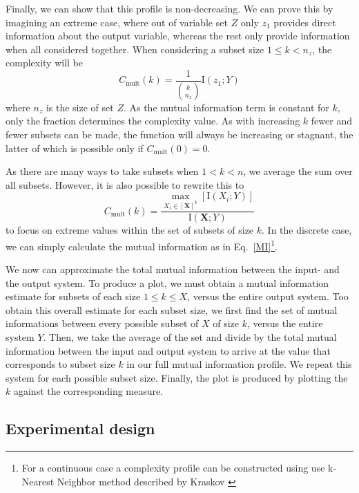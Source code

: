 \documentclass[../main.tex]{subfiles}
\begin{document}
Finally, we can show that this profile is non-decreasing.
We can prove this by imagining an extreme case, where out of variable set $Z$ only $z_1$ provides direct information about the output variable, whereas the rest only provide information when all considered together.
When considering a subset size $1 \le k < n_z $, the complexity will be
%
\begin{equation}
C_\mathrm{mult}\left( k \right)  = \frac{1}{\binom{k}{n_z}} \mathrm{I}\left( z_1;Y\right)
\end{equation}
%
where $n_z$ is the size of set $Z$.
As the mutual information term is constant for $k$, only the fraction determines the complexity value.
As with increasing $k$ fewer and fewer subsets can be made, the function will always be increasing or stagnant, the latter of which is possible only if $C_\mathrm{mult}\left( 0 \right) = 0$.

As there are many ways to take subsets when $1 < k < n$, we average the sum over all subsets.
However, it is also possible to rewrite this to
%
\begin{equation}
C_\mathrm{mult}\left( k \right) = \frac{\max_{X_i \in [\mathbf{X}]^k} [\mathrm{I}\left( X_i;Y \right)]}{\mathrm{I}\left( \mathbf{X};Y\right)}
\end{equation}
%
to focus on extreme values within the set of subsets of size $k$.
In the discrete case, we can simply calculate the mutual information as in Eq.~\ref{MI}\footnote{For a continuous case a complexity profile can be constructed using use k-Nearest Neighbor method described by Kraskov \cite{kraskov2004estimating}}.

We now can approximate the total mutual information between the input- and the output system.
To produce a plot, we must obtain a mutual information estimate for subsets of each size $1 \le k \le X$, versus the entire output system.
Too obtain this overall estimate for each subset size, we first find the set of mutual informations between every possible subset of $X$ of size $k$, versus the entire system $Y$.
Then, we take the average of the set and divide by the total mutual information between the input and output system to arrive at the value that corresponds to subset size $k$ in our full mutual information profile.
We repeat this system for each possible subset size.
Finally, the plot is produced by plotting the $k$ against the corresponding measure.

\subsection{Experimental design}
\end{document}
